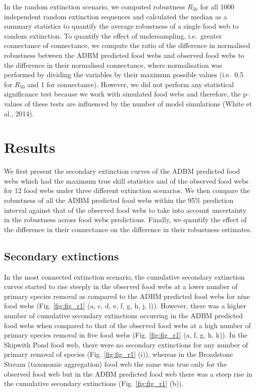 \documentclass{article}
\begin{document}
In the random extinction scenario, we computed robustness \(R_{50}\) for
all 1000 independent random extinction sequences and calculated the
median as a summary statistics to quantify the average robustness of a
single food web to random extinction. To quantify the effect of
undersampling, i.e.~greater connectance of connectance, we compute the
ratio of the difference in normalised robustness between the ADBM
predicted food webs and observed food webs to the difference in their
normalised connectance, where normalisation was performed by dividing
the variables by their maximum possible values (i.e.~0.5 for \(R_{50}\)
and 1 for connectance). However, we did not perform any statistical
significance test because we work with simulated food webs and
therefore, the p-values of these tests are influenced by the number of
model simulations (White et al., 2014).

\hypertarget{results}{%
\section{Results}\label{results}}

We first present the secondary extinction curves of the ADBM predicted
food webs which had the maximum true skill statistics and of the
observed food webs for 12 food webs under three different extinction
scenarios. We then compare the robustness of all the ADBM predicted food
webs within the 95\% prediction interval against that of the observed
food webs to take into account uncertainty in the robustness across food
webs predictions. Finally, we quantify the effect of the difference in
their connectance on the difference in their robustness estimates.

\hypertarget{secondary-extinctions}{%
\subsection{Secondary extinctions}\label{secondary-extinctions}}

In the most connected extinction scenario, the cumulative secondary
extinction curves started to rise steeply in the observed food webs at a
lower number of primary species removal as compared to the ADBM
predicted food webs for nine food webs (Fig. \ref{fig:fig_r1} (a, c, d,
e, f, g, h, j, l)). However, there was a higher number of cumulative
secondary extinctions occurring in the ADBM predicted food webs when
compared to that of the observed food webs at a high number of primary
species removal in five food webs (Fig. \ref{fig:fig_r1} (a, f, g, h,
k)). In the Skipwith Pond food web, there were no secondary extinctions
for any number of primary removal of species (Fig. \ref{fig:fig_r1}
(i)), whereas in the Broadstone Stream (taxonomic aggregation) food web
the same was true only for the observed food web but in the ADBM
predicted food web there was a steep rise in the cumulative secondary
extinctions (Fig. \ref{fig:fig_r1} (b)).
\end{document}
